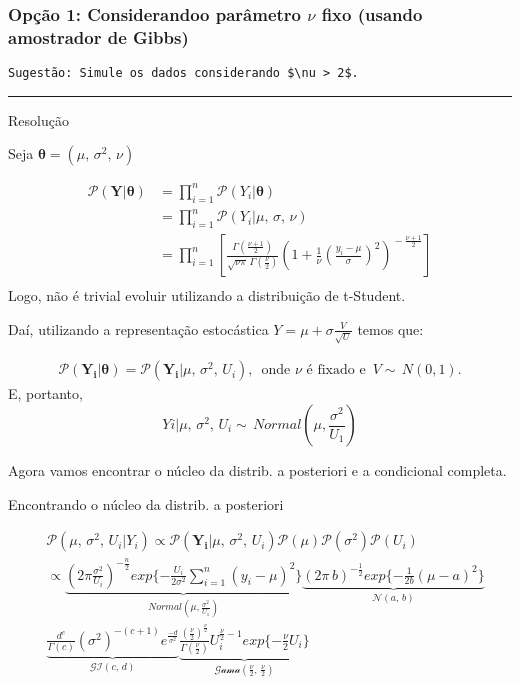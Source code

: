 \documentclass[]{article}
\begin{document}
\hypertarget{opuxe7uxe3o-1-considerandoo-paruxe2metro-nu-fixo-usando-amostrador-de-gibbs}{%
\subsubsection{\texorpdfstring{Opção 1: Considerandoo parâmetro \(\nu\)
fixo (usando amostrador de
Gibbs)}{Opção 1: Considerandoo parâmetro \textbackslash nu fixo (usando amostrador de Gibbs)}}\label{opuxe7uxe3o-1-considerandoo-paruxe2metro-nu-fixo-usando-amostrador-de-gibbs}}

\texttt{Sugestão:\ Simule\ os\ dados\ considerando\ \$\textbackslash{}nu\ \textgreater{}\ 2\$.}

\begin{center}\rule{0.5\linewidth}{\linethickness}\end{center}

Resolução

Seja \(\pmb{\theta} = (\mu,\,\sigma^{2},\,\nu)\)

\[
\begin{align}
\mathcal{P}(\pmb{Y}|\pmb{\theta}) 
& = \prod_{i=1}^{n}\mathcal{P}(Y_i|\pmb{\theta}) \\
& =
\prod_{i=1}^{n}\mathcal{P}(Y_i|\mu,\,\sigma,\,\nu) \\
& =
\prod_{i=1}^{n}\left[\frac{\Gamma(\frac{\nu+1}{2})} {\sqrt{\nu\pi}\,\Gamma(\frac{\nu}{2})} \left(1+\frac{1}{\nu}\left(\frac{y_i-\mu}{\sigma}\right)^{2} \right)^{\!-\frac{\nu+1}{2}}\right] \\
\end{align}
\] Logo, não é trivial evoluir utilizando a distribuição de t-Student.

Daí, utilizando a representação estocástica
\(Y = \mu + \sigma\frac{V}{\sqrt{U}}\) temos que:

\[
\begin{align}
\mathcal{P}(\pmb{Y_i}|\pmb{\theta}) = \mathcal{P}(\pmb{Y_i}|\mu,\,\sigma^{2},\,U_i),\, \text{ onde }\nu \text{ é fixado e }\,V\sim\,N(0,1).
\end{align}
\] E, portanto,
\[Yi|\mu,\,\sigma^{2},\,U_i\sim\,Normal(\mu,\frac{\sigma^2}{U_1})
\]

Agora vamos encontrar o núcleo da distrib. a posteriori e a condicional
completa.

Encontrando o núcleo da distrib. a posteriori

\[
\begin{align}
& \mathcal{P}(\mu,\,\sigma^{2},\,U_i|Y_i) \propto \mathcal{P}(\pmb{Y_i}|\mu,\,\sigma^{2},\,U_i)\mathcal{P}(\mu)\mathcal{P}(\sigma^2)\mathcal{P}(U_i) \\
& \propto \underbrace{\left(2\pi\frac{\sigma^2}{U_i}\right)^{-\frac{n}{2}}exp\{-\frac{U_i}{2\sigma^2}\sum_{i=1}^{n}(y_i-\mu)^2\}}_{Normal(\mu,\frac{\sigma^2}{U_1})} \underbrace{\left(2\pi\,b\right)^{-\frac{1}{2}}exp\{-\frac{1}{2b}(\mu-a)^2\}}_{\mathcal{N}(a,\,b)} \\
& \underbrace{\frac{d^c}{\Gamma(c)}(\sigma^2)^{-(c+1)}e^{\frac{-d}{\sigma^2}}}_{\mathcal{GI}(c,\,d)} \underbrace{\frac{\left(\frac{\nu}{2}\right)^{\frac{\nu}{2}}}{\Gamma(\frac{\nu}{2})}U_i^{\frac{\nu}{2}-1}exp\{-\frac{\nu}{2}U_i\}}_{\mathcal{Gama}(\frac{\nu}{2},\,\frac{\nu}{2})}
\end{align}
\]
\end{document}

